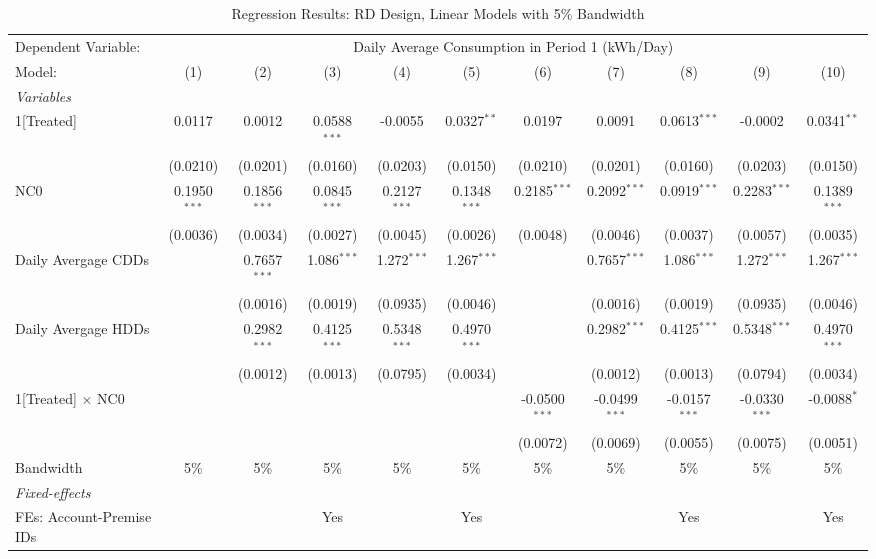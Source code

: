 \begin{table}[htbp]
\centering
\caption{\label{Table:Regression-Results_RD_Linear_BW-5} Regression Results: RD Design, Linear Models with 5\% Bandwidth}
\begin{tabular}{lcccccccccc}
\tabularnewline\toprule\toprule
Dependent Variable:&\multicolumn{10}{c}{Daily Average Consumption in Period 1 (kWh/Day)}\\
Model:&(1) & (2) & (3) & (4) & (5) & (6) & (7) & (8) & (9) & (10)\\
\midrule
\emph{Variables}&   &   &   &   &   &   &   &   &   &  \\
1[Treated]&0.0117 & 0.0012 & 0.0588$^{***}$ & -0.0055 & 0.0327$^{**}$ & 0.0197 & 0.0091 & 0.0613$^{***}$ & -0.0002 & 0.0341$^{**}$\\
  &(0.0210) & (0.0201) & (0.0160) & (0.0203) & (0.0150) & (0.0210) & (0.0201) & (0.0160) & (0.0203) & (0.0150)\\
NC0&0.1950$^{***}$ & 0.1856$^{***}$ & 0.0845$^{***}$ & 0.2127$^{***}$ & 0.1348$^{***}$ & 0.2185$^{***}$ & 0.2092$^{***}$ & 0.0919$^{***}$ & 0.2283$^{***}$ & 0.1389$^{***}$\\
  &(0.0036) & (0.0034) & (0.0027) & (0.0045) & (0.0026) & (0.0048) & (0.0046) & (0.0037) & (0.0057) & (0.0035)\\
Daily Avergage CDDs&   & 0.7657$^{***}$ & 1.086$^{***}$ & 1.272$^{***}$ & 1.267$^{***}$ &    & 0.7657$^{***}$ & 1.086$^{***}$ & 1.272$^{***}$ & 1.267$^{***}$\\
  &   & (0.0016) & (0.0019) & (0.0935) & (0.0046) &    & (0.0016) & (0.0019) & (0.0935) & (0.0046)\\
Daily Avergage HDDs&   & 0.2982$^{***}$ & 0.4125$^{***}$ & 0.5348$^{***}$ & 0.4970$^{***}$ &    & 0.2982$^{***}$ & 0.4125$^{***}$ & 0.5348$^{***}$ & 0.4970$^{***}$\\
  &   & (0.0012) & (0.0013) & (0.0795) & (0.0034) &    & (0.0012) & (0.0013) & (0.0794) & (0.0034)\\
1[Treated] $\times $ NC0&   &    &    &    &    & -0.0500$^{***}$ & -0.0499$^{***}$ & -0.0157$^{***}$ & -0.0330$^{***}$ & -0.0088$^{*}$\\
  &   &    &    &    &    & (0.0072) & (0.0069) & (0.0055) & (0.0075) & (0.0051)\\
\midrule Bandwidth & 5\% & 5\% & 5\% & 5\% & 5\% & 5\% & 5\% & 5\% & 5\% & 5\%\\
\midrule
\emph{Fixed-effects}&   &   &   &   &   &   &   &   &   &  \\
FEs: Account-Premise IDs &  &  & Yes &  & Yes &  &  & Yes &  & Yes\\

\end{tabular}
\end{table}
